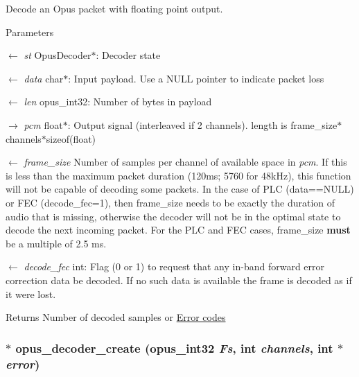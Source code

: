 Decode an Opus packet with floating point output. 
\begin{DoxyParams}{Parameters}
\item[\mbox{$\leftarrow$} {\em st}]{\ttfamily OpusDecoder$\ast$}: Decoder state \item[\mbox{$\leftarrow$} {\em data}]{\ttfamily char$\ast$}: Input payload. Use a NULL pointer to indicate packet loss \item[\mbox{$\leftarrow$} {\em len}]{\ttfamily opus\_\-int32}: Number of bytes in payload \item[\mbox{$\rightarrow$} {\em pcm}]{\ttfamily float$\ast$}: Output signal (interleaved if 2 channels). length is frame\_\-size$\ast$channels$\ast$sizeof(float) \item[\mbox{$\leftarrow$} {\em frame\_\-size}]Number of samples per channel of available space in {\itshape pcm\/}. If this is less than the maximum packet duration (120ms; 5760 for 48kHz), this function will not be capable of decoding some packets. In the case of PLC (data==NULL) or FEC (decode\_\-fec=1), then frame\_\-size needs to be exactly the duration of audio that is missing, otherwise the decoder will not be in the optimal state to decode the next incoming packet. For the PLC and FEC cases, frame\_\-size {\bfseries must} be a multiple of 2.5 ms. \item[\mbox{$\leftarrow$} {\em decode\_\-fec}]{\ttfamily int}: Flag (0 or 1) to request that any in-\/band forward error correction data be decoded. If no such data is available the frame is decoded as if it were lost. \end{DoxyParams}
\begin{DoxyReturn}{Returns}
Number of decoded samples or \hyperlink{group__opus__errorcodes}{Error codes} 
\end{DoxyReturn}
\hypertarget{group__opus__decoder_ga753f6fe0b699c81cfd47d70c8e15a0bd}{
\subsubsection[{opus\_\-decoder\_\-create}]{$\ast$ opus\_\-decoder\_\-create ({\bf opus\_\-int32} {\em Fs}, \/  int {\em channels}, \/  int $\ast$ {\em error})}}
\label{group__opus__decoder_ga753f6fe0b699c81cfd47d70c8e15a0bd}


